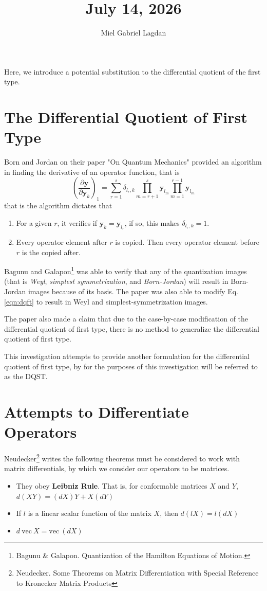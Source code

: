 \documentclass[a4paper]{article}
\title{July 14, 2026}
\author{Miel Gabriel Lagdan}
\begin{document}
	\maketitle
	Here, we introduce a potential substitution to the differential quotient of the first type.
	\section{The Differential Quotient of First Type}
	Born and Jordan on their paper "On Quantum Mechanics" provided an algorithm in finding the derivative of an operator function, that is
	\begin{equation}\label{eqn:dqft}
		\left(\frac{\partial\textbf{y}}{\partial\textbf{y}_k}\right)_1=\sum_{r=1}^s\delta_{l_r,k}\prod_{m=r+1}^s\textbf{y}_{l_m}\prod_{m=1}^{r-1}\textbf{y}_{l_m}
	\end{equation}
	that is the algorithm dictates that
	\begin{enumerate}
		\item For a given $r$, it verifies if $\textbf{y}_k=\textbf{y}_{l_r}$, if so, this makes $\delta_{l_r,k}=1$.
		\item Every operator element after $r$ is copied. Then every operator element before $r$ is the copied after.
	\end{enumerate}
	
	Bagunu and Galapon\footnote{Bagunu \& Galapon. Quantization of the Hamilton Equations of Motion.} was able to verify that any of the quantization images (that is \textit{Weyl}, \textit{simplest symmetrization}, and \textit{Born-Jordan}) will result in Born-Jordan images because of its basis. The paper was also able to modify Eq. \ref{eqn:dqft} to result in Weyl and simplest-symmetrization images.
	
	The paper also made a claim that due to the case-by-case modification of the differential quotient of first type, there is no method to generalize the differential quotient of first type.
	
	This investigation attempts to provide another formulation for the differential quotient of first type, by for the purposes of this investigation will be referred to as the DQST.
	
	\section{Attempts to Differentiate Operators}
	Neudecker\footnote{Neudecker. Some Theorems on Matrix Differentiation with Special Reference to Kronecker Matrix Products} writes the following theorems must be considered to work with matrix differentials, by which we consider our operators to be matrices.
	\begin{itemize}
		\item They obey \textbf{Leibniz Rule}. That is, for conformable matrices $X$ and $Y$, $d(XY)=(dX)Y+X(dY)$
		\item If $l$ is a linear scalar function of the matrix $X$, then $d(lX)=l(dX)$
		\item $d~\text{vec}~X=\text{vec}~(dX)$
	\end{itemize}
\end{document}
